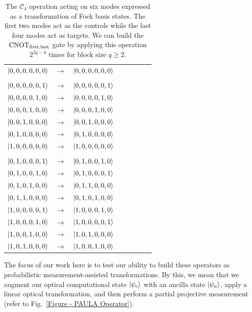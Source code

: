 \documentclass[aps,pra,twocolumn,superscriptaddress,floatfix,10pt]{revtex4}
\begin{document}
\begin {table}[h]
\begin{center}
	\begin{tabular}{l*{6}{c}r} 
		$\ket{0,0,0,0,0,0}$  &  $\rightarrow$ & $\ket{0,0,0,0,0,0}$ \\ \\
		$\ket{0,0,0,0,0,1}$  & $\rightarrow$ & $\ket{0,0,0,0,0,1}$ \\
		$\ket{0,0,0,0,1,0}$ & $\rightarrow$ & $\ket{0,0,0,0,1,0}$ \\
		$\ket{0,0,0,1,0,0}$ & $\rightarrow$ & $\ket{0,0,0,1,0,0} $ \\ 
		$\ket{0,0,1,0,0,0}$ & $\rightarrow$ & $\ket{0,0,1,0,0,0} $\\
		$\ket{0,1,0,0,0,0}$ & $\rightarrow$ & $\ket{0,1,0,0,0,0} $ \\
		$\ket{1,0,0,0,0,0}$ & $\rightarrow$ & $\ket{1,0,0,0,0,0} $ \\ \\
		$\ket{0,1,0,0,0,1}$  & $\rightarrow$ & $\ket{0,1,0,0,1,0}$ \\
		$\ket{0,1,0,0,1,0}$  & $\rightarrow$ & $\ket{0,1,0,0,0,1}$ \\
		$\ket{0,1,0,1,0,0}$  & $\rightarrow$ & $\ket{0,1,1,0,0,0}$ \\
		$\ket{0,1,1,0,0,0}$  & $\rightarrow$ & $\ket{0,1,0,1,0,0}$ \\
		$\ket{1,0,0,0,0,1}$  & $\rightarrow$ & $\ket{1,0,0,0,1,0}$ \\
		$\ket{1,0,0,0,1,0}$  & $\rightarrow$ & $\ket{1,0,0,0,0,1}$ \\
		$\ket{1,0,0,1,0,0}$  & $\rightarrow$ & $\ket{1,0,1,0,0,0}$ \\
		$\ket{1,0,1,0,0,0}$  & $\rightarrow$ & $\ket{1,0,0,1,0,0}$ \\
	\end{tabular}
	\caption{ \label{Two Controls Four Targets} The $\mathcal{C}_4$ operation acting on six modes expressed as a transformation of Fock basis states. The first two modes act as the controls while the last four modes act as targets. We can build the $\mbox{CNOT}_{\rm first,last}$ gate by applying this operation $2^{2 q - 4}$ times for block size $q \ge 2$.}
\end{center}
\end{table}
The focus of our work here is to test our ability to build these operators as probabilistic measurement-assisted transformations. By this, we mean that we augment our optical computational state $\ket{\psi_c}$ with an ancilla state $\ket{\psi_a}$, apply a linear optical transformation, and then perform a partial projective measurement (refer to Fig.~\ref{Figure - PAULA Operator}). 
\end{document}
